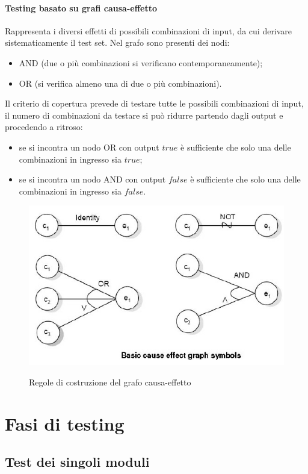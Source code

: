 \paragraph{Testing basato su grafi causa-effetto} Rappresenta i diversi effetti di possibili combinazioni di input, da cui derivare sistematicamente il test set. Nel grafo sono presenti dei nodi:
\begin{itemize}
    \item AND (due o più combinazioni si verificano contemporaneamente);
    \item OR (si verifica almeno una di due o più combinazioni).
\end{itemize}
Il criterio di copertura prevede di testare tutte le possibili combinazioni di input, il numero di combinazioni da testare si può ridurre partendo dagli output e procedendo a ritroso:
\begin{itemize}
    \item se si incontra un nodo OR con output $true$ è sufficiente che solo una delle combinazioni in ingresso sia $true$;
    \item se si incontra un nodo AND con output $false$ è sufficiente che solo una delle combinazioni in ingresso sia $false$.
\end{itemize}

\begin{figure}[H]
    \centering
    \includegraphics[width=0.75\linewidth]{assets/cause-effect-graph-symbols.png}
    \label{fig:cause-effect-graph-symbols}
    \caption{Regole di costruzione del grafo causa-effetto}
\end{figure}

\newpage

\section{Fasi di testing}

\subsection{Test dei singoli moduli}

